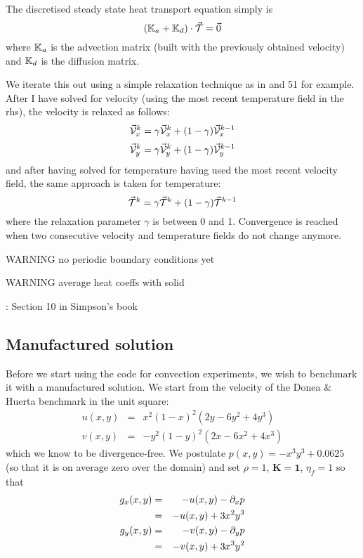 The discretised steady state heat transport equation simply is 
\[
({{\mathbb{K}}}_a + {{\mathbb{K}}}_d ) \cdot \vec{\cal T}= \vec{0}
\]
where ${\mathbb{K}}_a$ is the advection matrix (built with the previously obtained velocity) 
and ${\mathbb{K}}_d$ is the diffusion matrix.

We iterate this out using a simple relaxation technique \cite{vyrc13} as in  and 51 for example.
After I have solved for velocity (using the most recent temperature field in the rhs), 
the velocity is relaxed as follows:
\[
\vec{\cal V}_x^k = \gamma \vec{\cal V}_x^k + (1-\gamma) \vec{\cal V}_x^{k-1}
\]
\[
\vec{\cal V}_y^k = \gamma \vec{\cal V}_y^k + (1-\gamma) \vec{\cal V}_y^{k-1}
\]
and after having solved for temperature having used the most recent velocity field, the same approach is taken for temperature:
\[
\vec{\cal T}^k = \gamma \vec{\cal T}^k + (1-\gamma) \vec{\cal T}^{k-1}
\]
where the relaxation parameter $\gamma$ is between 0 and 1.
Convergence is reached when two consecutive velocity and temperature fields
do not change anymore.

\vspace{1cm}

WARNING no periodic boundary conditions yet

WARNING average heat coeffs with solid

\Literature: Section 10 in Simpson's book \cite{simp17}

\subsection*{Manufactured solution}

Before we start using the code for convection experiments, we wish to benchmark it
with a manufactured solution. 
We start from the velocity of the Donea \& Huerta benchmark in the unit square:
\begin{eqnarray}
u(x,y) &=& x^2(1- x)^2 (2y - 6y^2 + 4y^3)  \\
v(x,y) &=& -y^2 (1 - y)^2 (2x - 6x^2 + 4x^3) 
\end{eqnarray}
which we know to be divergence-free.
We postulate $p(x,y)=-x^3y^3+0.0625$ (so that it is on average zero over the domain) 
and set $\rho=1$, ${\bm K}={\bm 1}$, $\eta_f=1$ so that 
\begin{eqnarray} 
g_x(x,y) 
&=& -u(x,y) - \partial_x p \nonumber\\
&=& -u(x,y) +3x^2y^3 \nonumber\\ 
g_y(x,y)  
&=& -v(x,y) - \partial_y p \nonumber\\ 
&=& -v(x,y) +3x^3y^2 \nonumber
\end{eqnarray}

